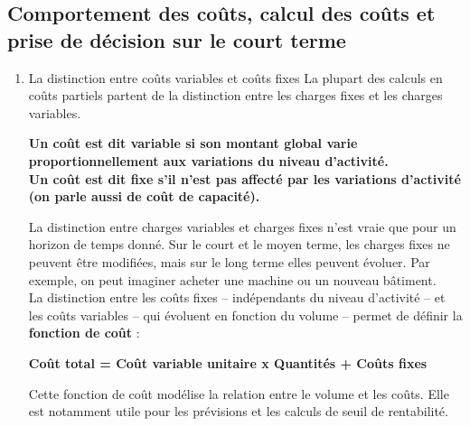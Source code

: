 \documentclass{tufte-handout}
\begin{document}
\subsection{Comportement des coûts, calcul des coûts et prise de décision sur le court terme}
\label{sec:orgfc32599}
\begin{enumerate}
\item La distinction entre coûts variables et coûts fixes
\label{sec:orge280375}
La plupart des calculs en coûts partiels partent de la distinction entre les charges fixes et les charges variables.\\
\begin{center}
\textbf{Un coût est dit variable si son montant global varie proportionnellement aux variations du niveau d'activité.}\\
\textbf{Un coût est dit fixe s'il n'est pas affecté par les variations d'activité (on parle aussi de coût de capacité).}\\
\end{center}
La distinction entre charges variables et charges fixes n'est vraie que pour un horizon de temps donné. Sur le court et le moyen terme, les charges fixes ne peuvent être modifiées, mais sur le long terme elles peuvent évoluer. Par exemple, on peut imaginer acheter une machine ou un nouveau bâtiment.\\
La distinction entre les coûts fixes – indépendants du niveau d'activité – et les coûts variables – qui évoluent en fonction du volume – permet de définir la \textbf{fonction de coût} :\\
\begin{center}
\textbf{Coût total = Coût variable unitaire x Quantités + Coûts fixes}\\
\end{center}
Cette fonction de coût modélise la relation entre le volume et les coûts. Elle est notamment utile pour les prévisions et les calculs de seuil de rentabilité.\\


\end{enumerate}
\end{document}
